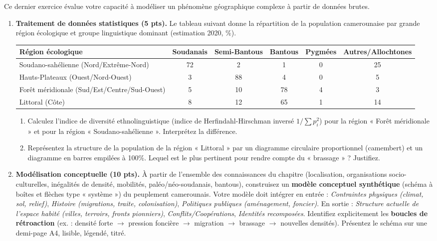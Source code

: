 \documentclass[11pt]{article}
\begin{document}
\begin{exercice}
Ce dernier exercice évalue votre capacité à modéliser un phénomène géographique complexe à partir de données brutes.

\begin{enumerate}
    \item \textbf{Traitement de données statistiques (5 pts).} Le tableau suivant donne la répartition de la population camerounaise par grande région écologique et groupe linguistique dominant (estimation 2020, \%). 
    \begin{center}
    \begin{tabular}{|l|c|c|c|c|c|}
    \hline
    \textbf{Région écologique} & \textbf{Soudanais} & \textbf{Semi-Bantous} & \textbf{Bantous} & \textbf{Pygmées} & \textbf{Autres/Allochtones} \\
    \hline
    Soudano-sahélienne (Nord/Extrême-Nord) & 72 & 2 & 1 & 0 & 25 \\
    Hauts-Plateaux (Ouest/Nord-Ouest) & 3 & 88 & 4 & 0 & 5 \\
    Forêt méridionale (Sud/Est/Centre/Sud-Ouest) & 5 & 10 & 78 & 4 & 3 \\
    Littoral (Côte) & 8 & 12 & 65 & 1 & 14 \\
    \hline
    \end{tabular}
    \end{center}
    \begin{enumerate}
        \item Calculez l'indice de diversité ethnolinguistique (indice de Herfindahl-Hirschman inversé $1/\sum p_i^2$) pour la région « Forêt méridionale » et pour la région « Soudano-sahélienne ». Interprétez la différence.
        \item Représentez la structure de la population de la région « Littoral » par un diagramme circulaire proportionnel (camembert) et un diagramme en barres empilées à 100\%. Lequel est le plus pertinent pour rendre compte du « brassage » ? Justifiez.
    \end{enumerate}

    \item \textbf{Modélisation conceptuelle (10 pts).} À partir de l'ensemble des connaissances du chapitre (localisation, organisations socio-culturelles, inégalités de densité, mobilités, paléo/néo-soudanais, bantous), construisez un \textbf{modèle conceptuel synthétique} (schéma à boîtes et flèches type « système ») du peuplement camerounais. 
    Votre modèle doit intégrer en entrée : \textit{Contraintes physiques (climat, sol, relief)}, \textit{Histoire (migrations, traite, colonisation)}, \textit{Politiques publiques (aménagement, foncier)}. 
    En sortie : \textit{Structure actuelle de l'espace habité (villes, terroirs, fronts pionniers)}, \textit{Conflits/Coopérations}, \textit{Identités recomposées}. 
    Identifiez explicitement les \textbf{boucles de rétroaction} (ex. : densité forte $\rightarrow$ pression foncière $\rightarrow$ migration $\rightarrow$ brassage $\rightarrow$ nouvelles densités). Présentez le schéma sur une demi-page A4, lisible, légendé, titré.


\end{enumerate}
\end{exercice}
\end{document}
